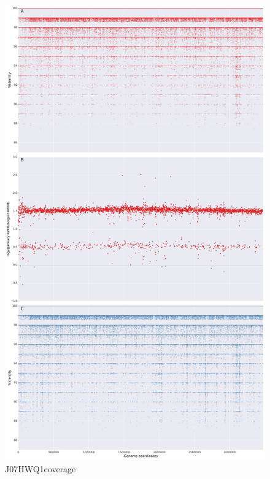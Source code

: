 \begin{figure}[!hbtp]
  \centering
  \includegraphics[width=\textwidth,height=\textheight,keepaspectratio]{Chapter5/Figures/coverage_plots/J07HWQ1_coverage.pdf}
  \caption{J07HWQ1coverage}
  \label{J07HWQ1coverage}
\end{figure}

